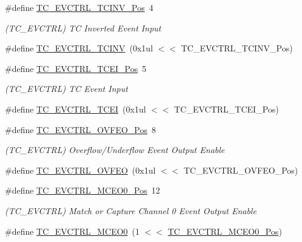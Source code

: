 \begin{DoxyCompactItemize}
\#define \mbox{\hyperlink{group___s_a_m_d21___t_c_gaf706c5718d05a7f5a8745d49156cc87d}{T\+C\+\_\+\+E\+V\+C\+T\+R\+L\+\_\+\+T\+C\+I\+N\+V\+\_\+\+Pos}}~4
\begin{DoxyCompactList}\small\item\em (T\+C\+\_\+\+E\+V\+C\+T\+RL) TC Inverted Event Input \end{DoxyCompactList}\item 
\#define \mbox{\hyperlink{group___s_a_m_d21___t_c_ga8af414bb1d73822a23ca6ca4e18a4ef8}{T\+C\+\_\+\+E\+V\+C\+T\+R\+L\+\_\+\+T\+C\+I\+NV}}~(0x1ul $<$$<$ T\+C\+\_\+\+E\+V\+C\+T\+R\+L\+\_\+\+T\+C\+I\+N\+V\+\_\+\+Pos)
\item 
\#define \mbox{\hyperlink{group___s_a_m_d21___t_c_ga96f939ff66c8f81ddf4d6c983eb36552}{T\+C\+\_\+\+E\+V\+C\+T\+R\+L\+\_\+\+T\+C\+E\+I\+\_\+\+Pos}}~5
\begin{DoxyCompactList}\small\item\em (T\+C\+\_\+\+E\+V\+C\+T\+RL) TC Event Input \end{DoxyCompactList}\item 
\#define \mbox{\hyperlink{group___s_a_m_d21___t_c_ga8e11ba23e105afdb6d457321a74ea6c8}{T\+C\+\_\+\+E\+V\+C\+T\+R\+L\+\_\+\+T\+C\+EI}}~(0x1ul $<$$<$ T\+C\+\_\+\+E\+V\+C\+T\+R\+L\+\_\+\+T\+C\+E\+I\+\_\+\+Pos)
\item 
\#define \mbox{\hyperlink{group___s_a_m_d21___t_c_ga79846c99ff75707e96ba7b4e4da1ceeb}{T\+C\+\_\+\+E\+V\+C\+T\+R\+L\+\_\+\+O\+V\+F\+E\+O\+\_\+\+Pos}}~8
\begin{DoxyCompactList}\small\item\em (T\+C\+\_\+\+E\+V\+C\+T\+RL) Overflow/\+Underflow Event Output Enable \end{DoxyCompactList}\item 
\#define \mbox{\hyperlink{group___s_a_m_d21___t_c_ga3f47b22a4764e14911649d4ed5379ddc}{T\+C\+\_\+\+E\+V\+C\+T\+R\+L\+\_\+\+O\+V\+F\+EO}}~(0x1ul $<$$<$ T\+C\+\_\+\+E\+V\+C\+T\+R\+L\+\_\+\+O\+V\+F\+E\+O\+\_\+\+Pos)
\item 
\#define \mbox{\hyperlink{group___s_a_m_d21___t_c_gabf0dbad463b5bb2ba2408c7741608af1}{T\+C\+\_\+\+E\+V\+C\+T\+R\+L\+\_\+\+M\+C\+E\+O0\+\_\+\+Pos}}~12
\begin{DoxyCompactList}\small\item\em (T\+C\+\_\+\+E\+V\+C\+T\+RL) Match or Capture Channel 0 Event Output Enable \end{DoxyCompactList}\item 
\#define \mbox{\hyperlink{group___s_a_m_d21___t_c_gaa74033bba9d65fd685b503f9ea66675f}{T\+C\+\_\+\+E\+V\+C\+T\+R\+L\+\_\+\+M\+C\+E\+O0}}~(1 $<$$<$ \mbox{\hyperlink{group___s_a_m_d21___t_c_gabf0dbad463b5bb2ba2408c7741608af1}{T\+C\+\_\+\+E\+V\+C\+T\+R\+L\+\_\+\+M\+C\+E\+O0\+\_\+\+Pos}})

\end{DoxyCompactItemize}
